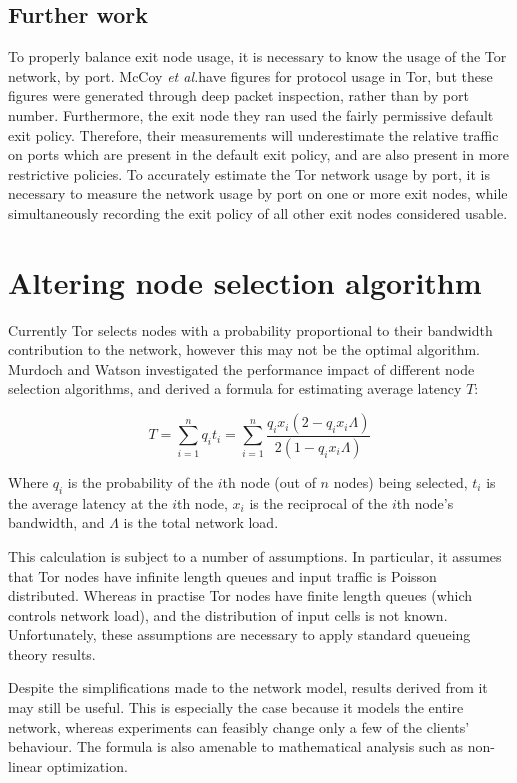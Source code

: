 \documentclass{article}
\makeatletter
\newcommand{\etal}{\textit{et al.\@\xspace}}
\makeatother
\begin{document}
\subsection{Further work}

To properly balance exit node usage, it is necessary to know the usage of the Tor network, by port.
McCoy \etal have figures for protocol usage in Tor, but these figures were generated through deep packet inspection, rather than by port number.
Furthermore, the exit node they ran used the fairly permissive default exit policy.
Therefore, their measurements will underestimate the relative traffic on ports which are present in the default exit policy, and are also present in more restrictive policies.
To accurately estimate the Tor network usage by port, it is necessary to measure the network usage by port on one or more exit nodes, while simultaneously recording the exit policy of all other exit nodes considered usable.

\section{Altering node selection algorithm}

Currently Tor selects nodes with a probability proportional to their bandwidth contribution to the network, however this may not be the optimal algorithm.
Murdoch and Watson investigated the performance impact of different node selection algorithms, and derived a formula for estimating average latency $T$:

\begin{equation}
T = \sum_{i=1}^n q_i t_i = \sum_{i=1}^n \frac{q_i x_i (2 - q_i x_i \Lambda)}{2 (1 - q_i x_i \Lambda)}
\label{eqn:waiting}
\end{equation}

Where $q_i$ is the probability of the $i$th node (out of $n$ nodes) being selected, $t_i$ is the average latency at the $i$th node, $x_i$ is the reciprocal of the $i$th node's bandwidth, and $\Lambda$ is the total network load.

This calculation is subject to a number of assumptions.
In particular, it assumes that Tor nodes have infinite length queues and input traffic is Poisson distributed.
Whereas in practise Tor nodes have finite length queues (which controls network load), and the distribution of input cells is not known.
Unfortunately, these assumptions are necessary to apply standard queueing theory results.

Despite the simplifications made to the network model, results derived from it may still be useful.
This is especially the case because it models the entire network, whereas experiments can feasibly change only a few of the clients' behaviour.
The formula is also amenable to mathematical analysis such as non-linear optimization.
\end{document}
